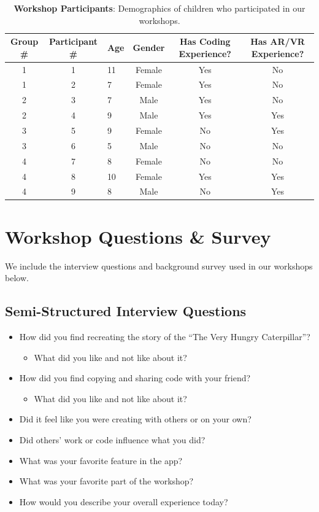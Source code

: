 \documentclass[sigconf,nonacm]{acmart}
\begin{document}
\begin{table}[t]
\centering
\footnotesize
\caption{\textbf{Workshop Participants}: Demographics of children who participated in our workshops.}
\label{tab:participants}
\begin{tabular}{cclccc}
\toprule
\textbf{Group \#} & \textbf{Participant \#} & \textbf{Age} & \textbf{Gender} & \textbf{Has Coding Experience?} & \textbf{Has AR/VR Experience?} \\
\midrule
1 & 1 & 11 & Female & Yes & No  \\ 
1 & 2 & 7  & Female & Yes & No  \\
\hline
2 & 3 & 7  & Male   & Yes & No  \\
2 & 4 & 9  & Male   & Yes & Yes \\
\hline
3 & 5 & 9  & Female & No  & Yes \\
3 & 6 & 5  & Male   & No  & No  \\
\hline
4 & 7 & 8  & Female & No  & No  \\
4 & 8 & 10 & Female & Yes & Yes \\
4 & 9 & 8  & Male   & No  & Yes \\
\bottomrule
\end{tabular}
\end{table}

\section{Workshop Questions \& Survey}
\label{app:workshop_details}
We include the interview questions and background survey used in our workshops below.

\subsection{Semi-Structured Interview Questions}
\begin{itemize}
    \item How did you find recreating the story of the ``The Very Hungry Caterpillar''? 
    \begin{itemize}
        \item What did you like and not like about it?
    \end{itemize}
    \item How did you find copying and sharing code with your friend?
    \begin{itemize}
        \item What did you like and not like about it?
    \end{itemize}
    \item Did it feel like you were creating with others or on your own? \item Did others’ work or code influence what you did?
    \item What was your favorite feature in the app?
    \item What was your favorite part of the workshop?
    \item How would you describe your overall experience today?
\end{itemize}
\end{document}
